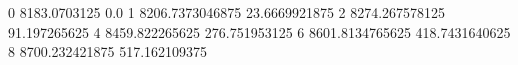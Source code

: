 0 8183.0703125 0.0
1 8206.7373046875 23.6669921875
2 8274.267578125 91.197265625
4 8459.822265625 276.751953125
6 8601.8134765625 418.7431640625
8 8700.232421875 517.162109375

